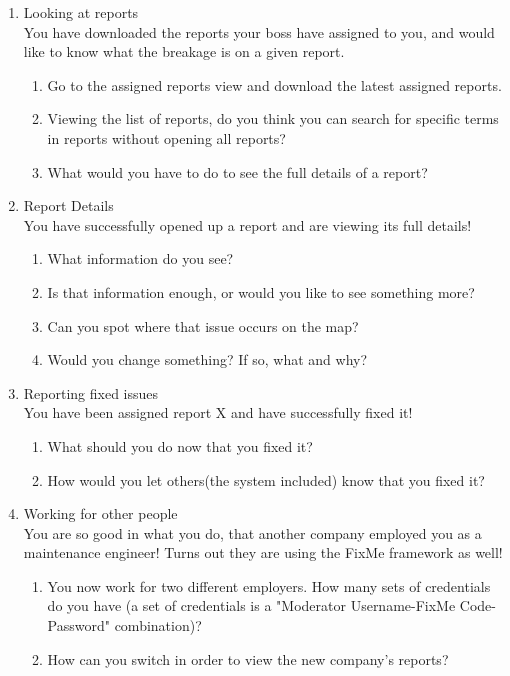 \documentclass[12pt]{article}
\begin{document}
\begin{enumerate}
\item Looking at reports\\
You have downloaded the reports your boss have assigned to you, and would like to know what the breakage is on a given report.
\begin{enumerate}
\item Go to the assigned reports view and download the latest assigned reports.
\item Viewing the list of reports, do you think you can search for specific terms in reports without opening all reports?
\item What would you have to do to see the full details of a report?
\end{enumerate}

\item Report Details\\
You have successfully opened up a report and are viewing its full details!
\begin{enumerate}
\item What information do you see?
\item Is that information enough, or would you like to see something more?
\item Can you spot where that issue occurs on the map?
\item Would you change something? If so, what and why?
\end{enumerate}

\item Reporting fixed issues \\
You have been assigned report X and have successfully fixed it!
\begin{enumerate}
\item What should you do now that you fixed it?
\item How would you let others(the system included) know that you fixed it?
\end{enumerate}

\item Working for other people\\
You are so good in what you do, that another company employed you as a maintenance engineer! Turns out they are using the FixMe framework as well!
\begin{enumerate}
\item You now work for two different employers. How many sets of credentials do you have (a set of credentials is a "Moderator Username-FixMe Code-Password" combination)?
\item How can you switch in order to view the new company's reports?
\end{enumerate}


\end{enumerate}
\end{document}
